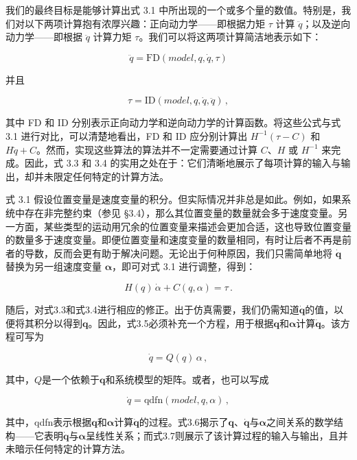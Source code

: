 \documentclass[10pt,a4paper]{book}
\theoremstyle{thmstyle} %
\theoremstyle{defstyle} %
\theoremstyle{prostyle} %
\begin{document}
我们的最终目标是能够计算出式 3.1 中所出现的一个或多个量的数值。特别是，我们对以下两项计算抱有浓厚兴趣：正向动力学——即根据力矩 $\tau$ 计算 $\ddot{q}$；以及逆向动力学——即根据 $\ddot{q}$ 计算力矩 $\tau$。我们可以将这两项计算简洁地表示如下：



$$
\ddot { q } = \mathrm { F D } ( m o d e l , q , \dot { q } , \tau )
$$



并且



$$
\tau = \mathrm { I D } ( m o d e l , q , \dot { q } , \ddot { q } ) \, ,
$$



其中 FD 和 ID 分别表示正向动力学和逆向动力学的计算函数。将这些公式与式 3.1 进行对比，可以清楚地看出，FD 和 ID 应分别计算出 $H^{-1}(\tau - C)$ 和 $H\ddot{q} + C$。然而，实现这些算法的算法并不一定需要通过计算 $C$、$H$ 或 $H^{-1}$ 来完成。因此，式 3.3 和 3.4 的实用之处在于：它们清晰地展示了每项计算的输入与输出，却并未限定任何特定的计算方法。



式 3.1 假设位置变量是速度变量的积分。但实际情况并非总是如此。例如，如果系统中存在非完整约束（参见 §3.4），那么其位置变量的数量就会多于速度变量。另一方面，某些类型的运动用冗余的位置变量来描述会更加合适，这也导致位置变量的数量多于速度变量。即便位置变量和速度变量的数量相同，有时让后者不再是前者的导数，反而会更有助于解决问题。无论出于何种原因，我们只需简单地将 $\dot{\boldsymbol{q}}$ 替换为另一组速度变量 $\boldsymbol{\alpha}$，即可对式 3.1 进行调整，得到：



$$
H ( q ) \, \dot { \alpha } + C ( q , \alpha ) = \tau \, .
$$



随后，对式3.3和式3.4进行相应的修正。出于仿真需要，我们仍需知道$\dot{\boldsymbol{q}}$的值，以便将其积分以得到$\boldsymbol{q}$。因此，式3.5必须补充一个方程，用于根据$\boldsymbol{q}$和$\boldsymbol{\alpha}$计算$\dot{\boldsymbol{q}}$。该方程可写为



$$
\dot { q } = Q ( q ) \, \alpha \, ,
$$



其中，$Q$是一个依赖于$\boldsymbol{q}$和系统模型的矩阵。或者，也可以写成



$$
\dot { q } = \mathrm { q d f n } ( m o d e l , q , \alpha ) \, ,
$$



其中，qdfn表示根据$\boldsymbol{q}$和$\boldsymbol{\alpha}$计算$\dot{\boldsymbol{q}}$的过程。式3.6揭示了$\boldsymbol{q}$、$\dot{\boldsymbol{q}}$与$\boldsymbol{\alpha}$之间关系的数学结构——它表明$\dot{\boldsymbol{q}}$与$\boldsymbol{\alpha}$呈线性关系；而式3.7则展示了该计算过程的输入与输出，且并未暗示任何特定的计算方法。
\end{document}
